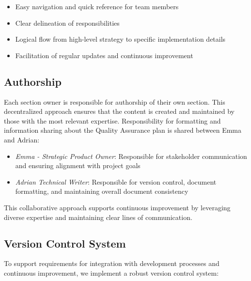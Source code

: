 \documentclass{article}
\begin{document}
\begin{itemize}
    \item Easy navigation and quick reference for team members
    \item Clear delineation of responsibilities
    \item Logical flow from high-level strategy to specific implementation details
    \item Facilitation of regular updates and continuous improvement
\end{itemize}

\subsection{Authorship}
Each section owner is responsible for authorship of their own section. This decentralized approach ensures that the content is created and maintained by those with the most relevant expertise. Responsibility for formatting and information sharing about the Quality Assurance plan is shared between Emma and Adrian:

\begin{itemize}
    \item \textit{Emma - Strategic Product Owner}: Responsible for stakeholder communication and ensuring alignment with project goals
    \item \textit{Adrian Technical Writer}: Responsible for version control, document formatting, and maintaining overall document consistency
\end{itemize}

This collaborative approach supports continuous improvement by leveraging diverse expertise and maintaining clear lines of communication.

\subsection{Version Control System}
To support requirements for integration with development processes and continuous improvement, we implement a robust version control system:
\end{document}
